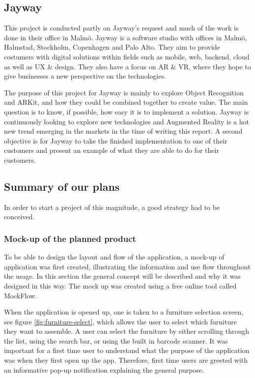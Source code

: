 \subsection{Jayway}
This project is conducted partly on Jayway's request and much of the work is done in their office in Malmö.
Jayway is a software studio with offices in Malmö, Halmstad, Stockholm, Copenhagen and Palo Alto. They aim to provide costumers with digital solutions  within fields such as mobile, web, backend, cloud as well as UX \& design. They also have a focus on AR \& VR, where they hope to give businesses a new perspective on the technologies.


The purpose of this project for Jayway is mainly to explore Object Recognition  and ARKit, and how they could be combined together to create value. The main question is to know, if possible, how easy it is to implement a solution.
Jayway is continuously looking to explore new technologies and Augmented Reality is a hot new trend emerging in the markets in the time of writing this report.
A second objective is for Jayway to take the finished implementation to one of their customers and
present an example of what they are able to do for their customers.

\newpage


\subsection{Summary of our plans}
In order to start a project of this magnitude, a good strategy had to be conceived. 

\subsubsection{Mock-up of the planned product}
To be able to design the layout and flow of the application, a mock-up of application was first created, illustrating the information and use flow throughout the usage. In this section the general concept will be described and why it was designed in this way. The mock up was created using a free online tool called MockFlow\cite{mockflow}. 

When the application is opened up, one is taken to a furniture selection screen, see figure \ref{fig:furniture-select}, which allows the user to select which furniture they want to assemble. A user can select the furniture by either scrolling through the list, using the search bar, or using the built in barcode scanner. It was important for a first time user to understand what the purpose of the application was when they first open up the app. Therefore, first time users are greeted with an informative pop-up notification explaining the general purpose.

